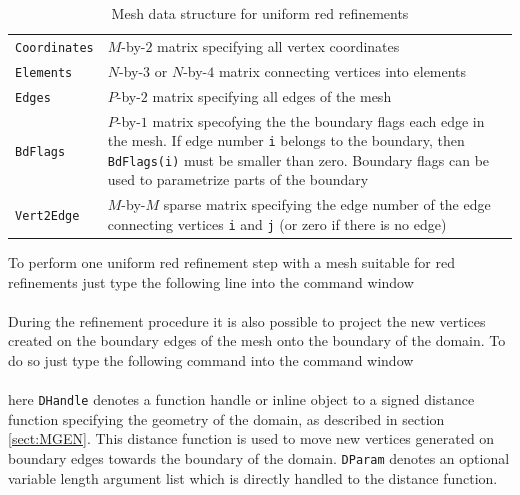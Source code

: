\begin{table}[htb]
  \begin{tabular}{p{2cm}p{9cm}}
    {\tt Coordinates} & {\small $M$-by-$2$ matrix specifying all vertex coordinates}                \\
    {\tt Elements}    & {\small $N$-by-$3$ or $N$-by-$4$ matrix connecting vertices into elements}  \\
    {\tt Edges}       & {\small $P$-by-$2$ matrix specifying all edges of the mesh}                 \\
    {\tt BdFlags}     & {\small $P$-by-$1$ matrix specofying the the boundary flags
                        each edge in the mesh. If edge number {\tt i} belongs to the
                        boundary, then {\tt BdFlags(i)} must be smaller than zero.
                        Boundary flags can be used to parametrize parts of the boundary}            \\
    {\tt Vert2Edge}   & {\small $M$-by-$M$ sparse matrix specifying the edge number
                        of the edge connecting vertices {\tt i} and {\tt j} (or zero
                        if there is no edge)}
  \end{tabular}
  \caption{Mesh data structure for uniform red refinements}
  \label{tab:MSH_R}
\end{table}

To perform one uniform red refinement step with a mesh suitable for red refinements just type the following line
into the \MATLAB command window \\

 \\

\noindent During the refinement procedure it is also possible to project the new vertices created on the boundary edges
of the mesh onto the boundary of the domain. To do so just type the following command into the \MATLAB command window \\

 \\

\noindent here {\tt DHandle} denotes a \MATLAB function handle or inline object to a signed distance function specifying
the geometry of the domain, as described in section \ref{sect:MGEN}. This distance function is used to move new vertices
generated on boundary edges towards the boundary of the domain. {\tt DParam} denotes an optional variable length argument
list which is directly handled to the distance function.

